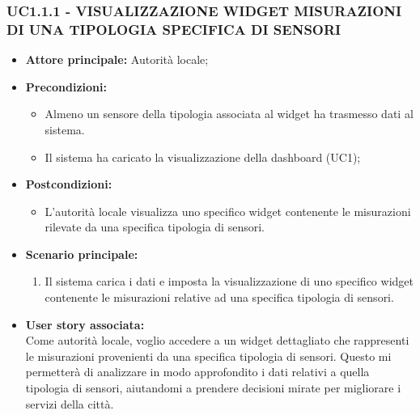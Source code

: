 \subsubsection{UC1.1.1 - VISUALIZZAZIONE WIDGET MISURAZIONI DI UNA TIPOLOGIA SPECIFICA DI SENSORI}

\begin{itemize}
    \item \textbf{Attore principale:} Autorità locale;
    \item \textbf{Precondizioni:}
        \begin{itemize}
            \item Almeno un sensore della tipologia associata al widget ha trasmesso dati al sistema.
            \item Il sistema ha caricato la visualizzazione della dashboard (UC1);
        \end{itemize}
    \item \textbf{Postcondizioni:}
        \begin{itemize}
            \item L'autorità locale visualizza uno specifico widget contenente le misurazioni rilevate da una specifica tipologia di sensori.
        \end{itemize}
    \item \textbf{Scenario principale:}
        \begin{enumerate}
            \item Il sistema carica i dati e imposta la visualizzazione di uno specifico widget contenente le misurazioni relative ad una specifica tipologia di sensori.
        \end{enumerate}
    \item \textbf{User story associata:} \\
        Come autorità locale, voglio accedere a un widget dettagliato che rappresenti le misurazioni provenienti da una specifica tipologia di sensori. Questo mi permetterà di analizzare in modo approfondito i dati relativi a quella tipologia di sensori, aiutandomi a prendere decisioni mirate per migliorare i servizi della città.
\end{itemize}